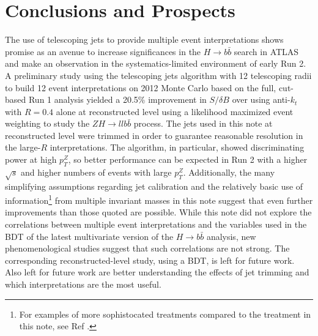 \section{Conclusions and Prospects}
\label{sec:con}
The use of telescoping jets to provide multiple event interpretations shows promise as an avenue to increase significances in the $H\to b\bar{b}$ search in ATLAS and make an observation in the systematics-limited environment of early Run 2.  A preliminary study using the telescoping jets algorithm with 12 telescoping radii to build 12 event interpretations on 2012 Monte Carlo based on the full, cut-based Run 1 analysis yielded a 20.5\% improvement in $S/\delta B$ over using anti-$k_t$ with $R=0.4$ alone at reconstructed level using a likelihood maximized event weighting to study the $ZH\to ll b\bar{b}$ process.  The jets used in this note at reconstructed level were trimmed in order to guarantee reasonable resolution in the large-$R$ interpretations.  The algorithm, in particular, showed discriminating power at high $p_T^Z$, so better performance can be expected in Run 2 with a higher $\sqrt{s}$ and higher numbers of events with large $p_T^Z$.  Additionally, the many simplifying assumptions regarding jet calibration and the relatively basic use of information\footnote{For examples of more sophistocated treatments compared to the treatment in this note, see Ref \cite{newschwartz}.} from multiple invariant masses in this note suggest that even further improvements than those quoted are possible.  While this note did not explore the correlations between multiple event interpretations and the variables used in the BDT of the latest multivariate version of the $H\to b\bar{b}$ analysis\cite{run1note}, new phenomenological studies suggest that such correlations are not strong\cite{newschwartz}.  The corresponding reconstructed-level study, using a BDT, is left for future work.  Also left for future work are better understanding the effects of jet trimming and which interpretations are the most useful.  

